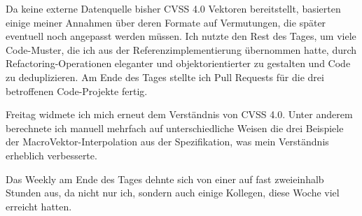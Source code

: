 Da keine externe Datenquelle bisher CVSS 4.0 Vektoren bereitstellt, basierten einige meiner Annahmen über deren Formate auf Vermutungen, die später eventuell noch angepasst werden müssen.
Ich nutzte den Rest des Tages, um viele Code-Muster, die ich aus der Referenzimplementierung übernommen hatte, durch Refactoring-Operationen eleganter und objektorientierter zu gestalten und Code zu deduplizieren.
Am Ende des Tages stellte ich Pull Requests für die drei betroffenen Code-Projekte fertig.

\sweekdaymarginpar{\weekdayFridayLong}

Freitag widmete ich mich erneut dem Verständnis von CVSS 4.0.
Unter anderem berechnete ich manuell mehrfach auf unterschiedliche Weisen die drei Beispiele der MacroVektor-Interpolation aus der Spezifikation, was mein Verständnis erheblich verbesserte.

Das Weekly am Ende des Tages dehnte sich von einer auf fast zweieinhalb Stunden aus, da nicht nur ich, sondern auch einige Kollegen, diese Woche viel erreicht hatten.
